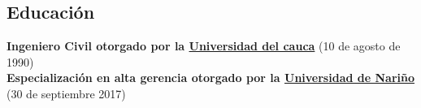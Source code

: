 \documentclass[letterpaper,10pt]{article}
\begin{document}
  \noindent\makebox[\linewidth]{\rule{\textwidth}{0.4pt}}
  
  \subsection*{Educación}
  \vspace*{0.4cm}
    \textbf{Ingeniero Civil otorgado por la  \href{https://www.unicauca.edu.co/}{Universidad del cauca}} \hfill (10 de agosto de 1990)\\
    \textbf{Especialización en alta gerencia otorgado por la  \href{https://www.udenar.edu.co/}{Universidad de Nariño}} \hfill (30 de septiembre 2017)
  \noindent\makebox[\linewidth]{\rule{\textwidth}{0.4pt}}
  
\end{document}
